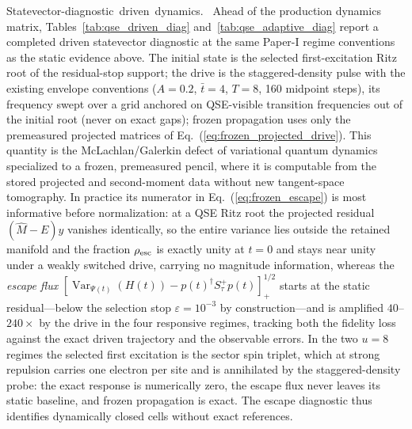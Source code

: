 \documentclass[
  reprint,
  amsmath,
  amssymb,
  aps,
  pra,
  nofootinbib,
  superscriptaddress,
  floatfix
]{revtex4-2}
\newcommand{\tentative}[1]{\textcolor{red!70!black}{#1}}
\newcommand{\structlabel}[1]{\noindent\mbox{\tentative{#1.}}~}
\newcommand{\Var}{\operatorname{Var}}
\begin{document}
\structlabel{Statevector-diagnostic driven dynamics}
Ahead of the production dynamics matrix, Tables~\ref{tab:qse_driven_diag} and~\ref{tab:qse_adaptive_diag} report a completed driven statevector diagnostic at the same Paper-I regime conventions as the static evidence above.  The initial state is the selected first-excitation Ritz root of the residual-stop support; the drive is the staggered-density pulse with the existing envelope conventions ($A=0.2$, $\bar t=4$, $T=8$, 160 midpoint steps), its frequency swept over a grid anchored on QSE-visible transition frequencies out of the initial root (never on exact gaps); frozen propagation uses only the premeasured projected matrices of Eq.~(\ref{eq:frozen_projected_drive}).  This quantity is the McLachlan/Galerkin defect of variational quantum dynamics \cite{Yao2021AVQDS} specialized to a frozen, premeasured pencil, where it is computable from the stored projected and second-moment data without new tangent-space tomography.  In practice its numerator in Eq.~(\ref{eq:frozen_escape}) is most informative before normalization: at a QSE Ritz root the projected residual $(\widehat M-E)y$ vanishes identically, so the entire variance lies outside the retained manifold and the fraction $\rho_{\rm esc}$ is exactly unity at $t=0$ and stays near unity under a weakly switched drive, carrying no magnitude information, whereas the \emph{escape flux} $[\Var_{\Psi(t)}(H(t))-p(t)^\dagger S_\tau^+p(t)]_+^{1/2}$ starts at the static residual---below the selection stop $\varepsilon=10^{-3}$ by construction---and is amplified $40$--$240\times$ by the drive in the four responsive regimes, tracking both the fidelity loss against the exact driven trajectory and the observable errors.  In the two $u=8$ regimes the selected first excitation is the sector spin triplet, which at strong repulsion carries one electron per site and is annihilated by the staggered-density probe: the exact response is numerically zero, the escape flux never leaves its static baseline, and frozen propagation is exact.  The escape diagnostic thus identifies dynamically closed cells without exact references.
\end{document}
